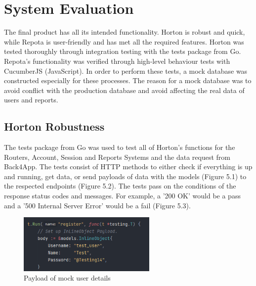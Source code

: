 \chapter{System Evaluation}
The final product has all its intended functionality. Horton is robust and quick, while Repota is user-friendly and has met all the required features. Horton was tested thoroughly through integration testing with the tests package from Go. Repota's functionality was verified through high-level behaviour tests with CucumberJS (JavaScript). In order to perform these tests, a mock database was constructed especially for these processes. The reason for a mock database was to avoid conflict with the production database and avoid affecting the real data of users and reports.

\section{Horton Robustness}
The tests package from Go was used to test all of Horton's functions for the Routers, Account, Session and Reports Systems and the data request from Back4App. The tests consist of HTTP methods to either check if everything is up and running, get data, or send payloads of data with the models (Figure 5.1) to the respected endpoints (Figure 5.2). The tests pass on the conditions of the response status codes and messages. For example, a '200 OK' would be a pass and a '500 Internal Server Error' would be a fail (Figure 5.3).

\begin{figure}[H]
    \centering
    \caption{Payload of mock user details}
    \label{image:registertest}
    \includegraphics[width=0.6\textwidth]{images/horton/tests/register_test_payload.png}
\end{figure}


